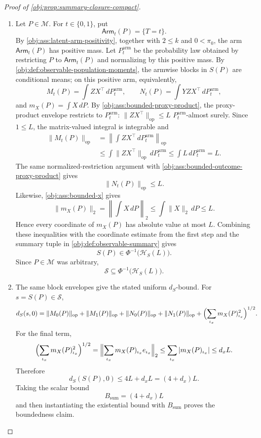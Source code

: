 \documentclass[11pt]{article}
\begin{document}
\begin{proof}[Proof of \cref{obj:prop:summary-closure-compact}]
\begin{enumerate}
\item Let \(P\in\mathcal M\).  For \(t\in\{0,1\}\), put
\[
        \mathsf{Arm}_t(P)=\{T=t\}.
\]
By \cref{obj:ass:latent-arm-positivity}, together with \(2\le k\) and \(0<\pi_0\), the arm \(\mathsf{Arm}_t(P)\) has positive mass.  Let \(P^{\mathrm{arm}}_t\) be the probability law obtained by restricting \(P\) to \(\mathsf{Arm}_t(P)\) and normalizing by this positive mass.  By \cref{obj:def:observable-population-moments}, the armwise blocks in \(S(P)\) are conditional means; on this positive arm, equivalently,
\[
        M_t(P)=\int ZX^\top\,dP^{\mathrm{arm}}_t,
        \qquad
        N_t(P)=\int YZX^\top\,dP^{\mathrm{arm}}_t,
\]
and \(m_X(P)=\int X\,dP\).  By \cref{obj:ass:bounded-proxy-product}, the proxy-product envelope restricts to \(P^{\mathrm{arm}}_t\): \(\|ZX^\top\|_{\mathrm{op}}\le L\) \(P^{\mathrm{arm}}_t\)-almost surely.  Since \(1\le L\), the matrix-valued integral is integrable and
\[
\begin{aligned}
\|M_t(P)\|_{\mathrm{op}}
&=\left\|\int ZX^\top\,dP^{\mathrm{arm}}_t\right\|_{\mathrm{op}}  \\
&\le \int \|ZX^\top\|_{\mathrm{op}}\,dP^{\mathrm{arm}}_t
 \le \int L\,dP^{\mathrm{arm}}_t
 = L .
\end{aligned}
\]
The same normalized-restriction argument with \cref{obj:ass:bounded-outcome-proxy-product} gives
\[
        \|N_t(P)\|_{\mathrm{op}}\le L .
\]
Likewise, \cref{obj:ass:bounded-x} gives
\[
\|m_X(P)\|_2
=\left\|\int X\,dP\right\|_2
\le
\int \|X\|_2\,dP
\le L .
\]
Hence every coordinate of \(m_X(P)\) has absolute value at most \(L\).  Combining these inequalities with the coordinate estimate from the first step and the summary tuple in \cref{obj:def:observable-summary} gives
\[
        S(P)\in \Phi^{-1}\bigl(\mathcal H_S(L)\bigr).
\]
Since \(P\in\mathcal M\) was arbitrary,
\[
        \mathscr S\subseteq \Phi^{-1}\bigl(\mathcal H_S(L)\bigr).
\] %

\item The same block envelopes give the stated uniform \(d_S\)-bound.  For \(s=S(P)\in\mathscr S\),
\[
\begin{aligned}
d_S(s,0)
&=
\|M_0(P)\|_{\mathrm{op}}
+\|M_1(P)\|_{\mathrm{op}}
+\|N_0(P)\|_{\mathrm{op}}
+\|N_1(P)\|_{\mathrm{op}}
+\Bigl(\sum_{\iota_x} m_X(P)_{\iota_x}^2\Bigr)^{1/2}.
\end{aligned}
\]
For the final term,
\[
\Bigl(\sum_{\iota_x} m_X(P)_{\iota_x}^2\Bigr)^{1/2}
=
\Bigl\|\sum_{\iota_x} m_X(P)_{\iota_x} e_{\iota_x}\Bigr\|_2
\le
\sum_{\iota_x}|m_X(P)_{\iota_x}|
\le
d_x L.
\]
Therefore
\[
        d_S(S(P),0)\le 4L+d_xL=(4+d_x)L.
\]
Taking the scalar bound
\[
        B_{\mathrm{sum}}=(4+d_x)L
\]
and then instantiating the existential bound with \(B_{\mathrm{sum}}\) proves the boundedness claim. %


\end{enumerate}
\end{proof}
\end{document}
